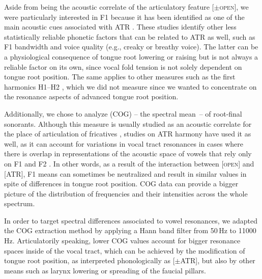 \documentclass[output=paper,colorlinks,citecolor=brown]{langscibook}
\begin{document}
Aside from being the acoustic correlate of the articulatory feature [$\pm$\textsc{open}], we were particularly interested in F1 because it has been identified as one of the main acoustic cues associated with ATR \citep{hess1992assimilatory, koffi2016acoustic, olejarczuk2019acoustic}. These studies identify other less statistically reliable phonetic factors that can be related to ATR as well, such as F1 bandwidth and voice quality (e.g., creaky or breathy voice). The latter can be a physiological consequence of tongue root lowering or raising but is not always a reliable factor on its own, since vocal fold tension is not solely dependent on tongue root position. The same applies to other measures such as the first harmonics H1--H2 \citep{yang2021measuring}, which we did not measure since we wanted to concentrate on the resonance aspects of advanced tongue root position.

Additionally, we chose to analyze  (COG) -- the spectral mean~-- of root-final sonorants. Although this measure is usually studied as an acoustic correlate for the place of articulation of fricatives \citep{figueroa2021}, studies on ATR harmony have used it as well, as it can account for variations in vocal tract resonances in cases where there is overlap in representations of the acoustic space of vowels that rely only on F1 and F2 \citep{anderson2007, kingston1997}. In other words, as a result of the interaction between [\textsc{open}] and [ATR], F1 means can sometimes be neutralized and result in similar values in spite of differences in tongue root position. COG data can provide a bigger picture of the distribution of frequencies and their intensities across the whole spectrum.

\begin{sloppypar}
In order to target spectral differences associated to vowel resonances, we adapted the COG extraction method by applying a Hann band filter from 50\,Hz to 11000\,Hz. Articulatorily speaking, lower COG values account for bigger resonance spaces inside of the vocal tract, which can be achieved by the modification of tongue root position, as interpreted phonologically as [$\pm$ATR], but also by other means such as larynx lowering or spreading of the faucial pillars.
\end{sloppypar}
\end{document}
